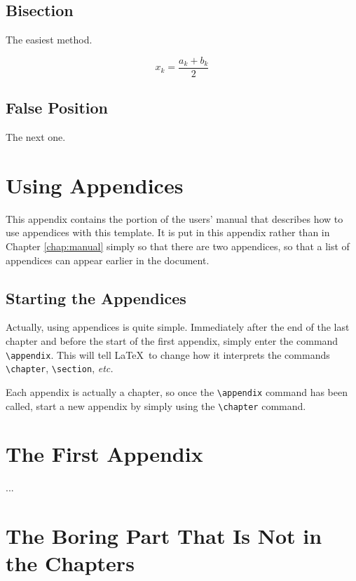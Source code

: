 \documentclass[thesis]{./tex/thesis-umich}
\begin{document}
\section{Bisection}
The easiest method.

\begin{equation}
x_k = \frac{a_k+b_k}{2}
\end{equation}

\section{False Position}
The next one.


\chapter{Using Appendices}    \label{app:appendix}
This appendix contains the portion of the users' manual that describes
how to use appendices with this template.  It is put in this appendix
rather than in Chapter \ref{chap:manual} simply so that there are two
appendices, so that a list of appendices can appear earlier in the
document.

\section{Starting the Appendices}
Actually, using appendices is quite simple.  Immediately after the end
of the last chapter and before the start of the first appendix, simply
enter the command \verb|\appendix|.  This will tell \LaTeX~to change
how it interprets the commands \verb|\chapter|, \verb|\section|,
\textit{etc.}

Each appendix is actually a chapter, so once the \verb|\appendix|
command has been called, start a new appendix by simply using the
\verb|\chapter| command.
\begin{code}
\appendix
\chapter{The First Appendix}
...

\chapter{The Boring Part That Is Not in the Chapters}
\end{code}
\end{document}

